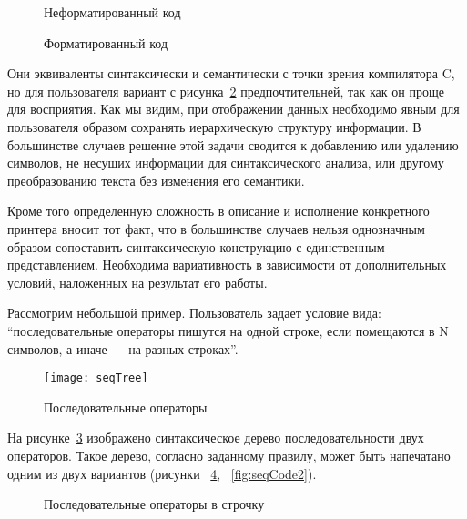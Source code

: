 \begin{figure}[h!]
	\centering
	
	\caption{Неформатированный код}
	\label{fig:wikiExUnfor}
\end{figure}

\begin{figure}[h!]
	\centering
	
	\caption{Форматированный код}
	\label{fig:wikiExBSD}
\end{figure}

Они эквиваленты синтаксически и семантически с точки зрения компилятора C, но для пользователя вариант с рисунка~\ref{fig:wikiExBSD} предпочтительней, так как он проще для восприятия. Как мы видим, при отображении данных необходимо явным для пользователя образом сохранять иерархическую структуру информации. В большинстве случаев решение этой задачи сводится к добавлению или удалению символов, не несущих информации для синтаксического анализа, или другому преобразованию текста без изменения его семантики.

Кроме того определенную сложность в описание и исполнение конкретного принтера вносит тот факт, что в большинстве случаев нельзя однозначным образом сопоставить синтаксическую конструкцию с единственным представлением. Необходима вариативность в зависимости от дополнительных условий, наложенных на результат его работы.

Рассмотрим небольшой пример. Пользователь задает условие вида: “последовательные операторы пишутся на одной строке, если помещаются в N символов, а иначе --- на разных строках”.

\begin{figure}[h!]
	\centering
	\texttt{[image: seqTree]}
	\caption{Последовательные операторы}
	\label{fig:seqImage}
\end{figure}

На рисунке~\ref{fig:seqImage} изображено синтаксическое дерево последовательности двух операторов. Такое дерево, согласно заданному правилу, может быть напечатано одним из двух вариантов (рисунки ~\ref{fig:seqCode1}, ~\ref{fig:seqCode2}).

\begin{figure}[h!]
	\centering
	
	\caption{Последовательные операторы в строчку}
	\label{fig:seqCode1}
\end{figure}

